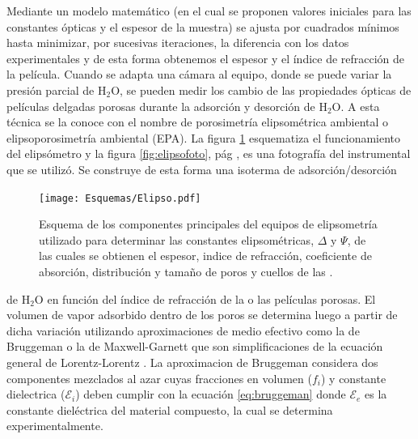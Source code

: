 		Mediante un modelo matemático (en el cual se proponen valores iniciales para las constantes ópticas y el espesor de la muestra) se ajusta por cuadrados mínimos hasta minimizar, por sucesivas iteraciones, la diferencia con los datos experimentales y de esta forma obtenemos el espesor y el índice de refracción de la película. Cuando se adapta una cámara al equipo, donde se puede variar la presión parcial de H$_2$O, se pueden medir los cambio de las propiedades ópticas de películas delgadas porosas durante la adsorción y desorción de H$_2$O. A esta técnica se la conoce con el nombre de porosimetría elipsométrica ambiental o elipsoporosimetría ambiental (EPA). La figura \ref{fig:elipso} esquematiza el funcionamiento del elipsómetro y la figura \ref{fig:elipsofoto}, pág \pageref{fig:elipsofoto}, es una fotografía del instrumental que se utilizó. Se construye de esta forma una isoterma de adsorción/desorción 
			  \begin{figure}[t]
			  \begin{center}
			  \texttt{[image: Esquemas/Elipso.pdf]}
			  \caption[Esquema de la técncia de elipsoporosimetría ambiental]{Esquema de los componentes principales del equipos de elipsometría utilizado para determinar las constantes elipsométricas, $\Delta$ y $\Psi$, de las cuales se obtienen el espesor, indice de refracción, coeficiente de absorción,  distribución y tamaño de poros y cuellos de las \pdm.}
			  \label{fig:elipso}
			  \end{center}
			  \end{figure}
		de H$_2$O en función del índice de refracción de la o las películas porosas.\cite{Baklanov2000,Boissiere2005,Sing1985} El volumen de vapor adsorbido dentro de los poros se determina luego a partir de dicha variación utilizando aproximaciones de medio efectivo como la de Bruggeman\cite{Bruggeman1935} o la de Maxwell-Garnett\cite{Garnett1906} que son simplificaciones de la ecuación general de Lorentz-Lorentz \cite{TompkinsHarlandG.1999}.
		La aproximacion de Bruggeman considera dos componentes mezclados al azar cuyas fracciones en volumen ($f_i$) y constante dielectrica ($\mathcal{E}_i$) deben cumplir con la ecuación \ref{eq:bruggeman} donde $\mathcal{E}_e$ es la constante dieléctrica del material compuesto, la cual se determina experimentalmente.
